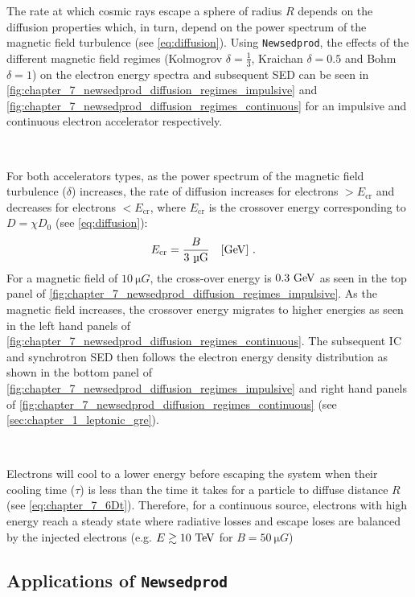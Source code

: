 The rate at which cosmic rays escape a sphere of radius $R$ depends on the diffusion properties which, in turn, depend on the power spectrum of the magnetic field turbulence (see \autoref{eq:diffusion}). Using {\tt Newsedprod}, the effects of the different magnetic field regimes (Kolmogrov $\delta=\frac{1}{3}$, Kraichan $\delta=0.5$ and Bohm $\delta=1$) on the electron energy spectra and subsequent SED can be seen in \autoref{fig:chapter_7_newsedprod_diffusion_regimes_impulsive} and \autoref{fig:chapter_7_newsedprod_diffusion_regimes_continuous} for an impulsive and continuous electron accelerator respectively.
\par~\par 
For both accelerators types, as the power spectrum of the magnetic field turbulence ($\delta$) increases, the rate of diffusion increases for electrons $>E_\text{cr}$ and decreases for electrons $<E_\text{cr}$, where $E_\text{cr}$ is the crossover energy corresponding to $D=\chi D_0$ (see \autoref{eq:diffusion}):
\begin{equation}
    \begin{aligned}
        E_\text{cr}&=\frac{B}{3~\si{\micro G}}\quad\qty[\GeV]\text{ .}
    \end{aligned}
\end{equation}
\noindent For a magnetic field of $10~\si{\micro G}$, the cross-over energy is $0.3~\GeV$ as seen in the top panel of \autoref{fig:chapter_7_newsedprod_diffusion_regimes_impulsive}. As the magnetic field increases, the crossover energy migrates to higher energies as seen in the left hand panels of \autoref{fig:chapter_7_newsedprod_diffusion_regimes_continuous}. The subsequent IC and synchrotron SED then follows the electron energy density distribution as shown in the bottom panel of \autoref{fig:chapter_7_newsedprod_diffusion_regimes_impulsive} and right hand panels of \autoref{fig:chapter_7_newsedprod_diffusion_regimes_continuous} (see \autoref{sec:chapter_1_leptonic_gre}).
\par~\par 
Electrons will cool to a lower energy before escaping the system when their cooling time ($\tau$) is less than the time it takes for a particle to diffuse distance $R$ (see \autoref{eq:chapter_7_6Dt}). Therefore, for a continuous source, electrons with high energy reach a steady state where radiative losses and escape loses are balanced by the injected electrons (e.g. $E\gtrsim 10~\TeV$ for $B=50~\si{\micro G}$)

\subsection{Applications of {\tt Newsedprod}}

